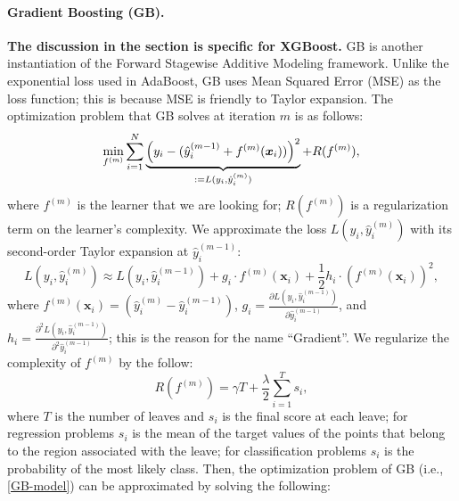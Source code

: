         \paragraph{Gradient Boosting (GB).} 
        \textbf{The discussion in the section is specific for XGBoost.}  
        GB is another instantiation of the Forward Stagewise Additive Modeling framework.
        Unlike the exponential loss used in AdaBoost, GB uses Mean 
        Squared Error (MSE) as the loss function; this is because MSE is friendly to Taylor expansion. 
        The optimization problem that GB solves at iteration $m$ is as follows:
            \begin{equation}\label{GB-model}
                \min_{f^{(m)}} \sum_{i=1}^{N}{
                    \underbrace{\left( y_i - (\hat{y}^{(m-1)}_i + f^{(m)}(\bm{x}_i)) \right)^2}_{:=L(y_i, \hat{y}_i^{(m)}) } + R(f^{(m)}),
                }
            \end{equation}
        where $f^{(m)}$ is the learner that we are looking for; $R(f^{(m)})$ is a regularization term on the learner's complexity.
        We approximate the loss $L(y_i, \hat{y}_i^{(m)})$ with its second-order Taylor expansion at $\hat{y}^{(m-1)}_i$:
            \begin{equation}
                L(y_i, \hat{y}_i^{(m)}) \approx L(y_i, \hat{y}^{(m-1)}_i) + g_i \cdot f^{(m)}(\bm{x}_i) + \frac{1}{2} h_i \cdot (f^{(m)}(\bm{x}_i))^2,
            \end{equation}
        where $f^{(m)}(\bm{x}_i) = (\hat{y}_i^{(m)} - \hat{y}_i^{(m-1)})$, $g_i = \frac{\partial L(y_i, \hat{y}_i^{(m-1)})}{\partial \hat{y}_i^{(m-1)} }$, and $h_i = \frac{\partial^2 L(y_i, \hat{y}_i^{(m-1)})}{\partial^2 \hat{y}_i^{(m-1)} }$; this is the reason for the name ``Gradient''.
        We regularize the complexity of $f^{(m)}$ by the follow:
            \begin{equation}
                R(f^{(m)}) = \gamma T + \frac{\lambda}{2}\sum_{i=1}^{T}{s_i},
            \end{equation}
        where $T$ is the number of leaves and $s_i$ is the final score at each leave; for regression problems $s_i$ is the mean of the target values of the points that belong to the region associated with the leave; for classification problems $s_i$ is the probability of the most likely class.
        Then, the optimization problem of GB (i.e., \eqref{GB-model}) can be approximated by solving the following:
